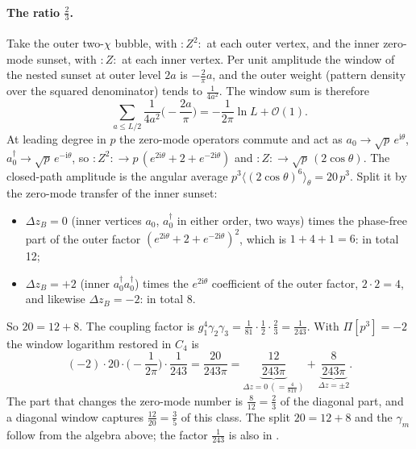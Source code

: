 \paragraph{The ratio $\frac23$.} Take the outer two-$\chi$ bubble, with ${:}Z^2{:}$ at each outer vertex, and the inner
zero-mode sunset, with ${:}Z{:}$ at each inner vertex. Per unit amplitude the window of the nested sunset at outer level $2a$
is $-\frac2\pi a$, and the outer weight (pattern density over the squared denominator) tends to $\frac1{4a^2}$. The window sum
is therefore
\begin{equation}
 \sum_{a\le L/2}\frac1{4a^2}\Big(-\frac{2a}\pi\Big)=-\frac1{2\pi}\ln L+\mathcal O(1) .
\end{equation}
At leading degree in $p$ the zero-mode operators commute and act as $a_0\to\sqrt p\,e^{\mathrm i\theta}$,
$a_0^\dagger\to\sqrt p\,e^{-\mathrm i\theta}$, so ${:}Z^2{:}\to p\,(e^{2\mathrm i\theta}+2+e^{-2\mathrm i\theta})$ and
${:}Z{:}\to\sqrt p\,(2\cos\theta)$. The closed-path amplitude is the angular average $p^3\langle(2\cos\theta)^6\rangle_\theta=
20\,p^3$. Split it by the zero-mode transfer of the inner sunset:
\begin{itemize}
\item $\Delta z_B=0$ (inner vertices $a_0$, $a_0^\dagger$ in either order, two ways) times the phase-free part of the outer
 factor $(e^{2\mathrm i\theta}+2+e^{-2\mathrm i\theta})^2$, which is $1+4+1=6$: in total 12;
\item $\Delta z_B=+2$ (inner $a_0^\dagger a_0^\dagger$) times the $e^{2\mathrm i\theta}$ coefficient of the outer factor,
 $2\cdot2=4$, and likewise $\Delta z_B=-2$: in total 8.
\end{itemize}
So $20=12+8$. The coupling factor is $g_1^4\gamma_2\gamma_3=\frac1{81}\cdot\frac12\cdot\frac23=\frac1{243}$. With
$\Pi[p^3]=-2$ the window logarithm restored in $C_4$ is
\begin{equation}
 (-2)\cdot20\cdot\Big(-\frac1{2\pi}\Big)\cdot\frac1{243}=\frac{20}{243\pi}
 =\underbrace{\frac{12}{243\pi}}_{\Delta z=0\ (=\frac4{81\pi})}+\underbrace{\frac{8}{243\pi}}_{\Delta z=\pm2} .
\end{equation}
The part that changes the zero-mode number is $\frac8{12}=\frac23$ of the diagonal part, and a diagonal window captures
$\frac{12}{20}=\frac35$ of this class. The split $20=12+8$ and the $\gamma_m$ follow from the algebra above; the factor
$\frac1{243}$ is also in .

